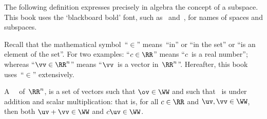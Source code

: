 The following definition expresses precisely in algebra the concept of a subspace.
This book uses the `blackboard bold' font, such as \WW\ and~\RR, for names of spaces and subspaces.

Recall that the mathematical symbol~``\(\in\)''\index{$\in$} means~``in'' or ``in the set'' or ``is an element of the set''.
For two examples: ``\(c\in\RR\)'' means ``\(c\)~is a real number''; whereas ``\(\vv\in\RR^n\)'' means ``\(\vv\)~is a vector in~\(\RR^n\)''.
Hereafter, this book uses~``\(\in\)'' extensively.


\begin{definition} \label{def:subspace} 
A ~\WW\ of~\(\RR^n\),  is a set of vectors such that \(\ov\in\WW\) and such that \WW\ is  under addition and scalar multiplication: that is, for all \(c\in\RR\) and \(\uv,\vv\in\WW\), then both \(\uv+\vv\in\WW\) and \(c\uv\in\WW\).
\end{definition}


